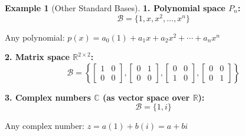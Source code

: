 \documentclass[12pt,a4paper]{article}
\theoremstyle{definition}
\newtheorem{example}{Example}[section]
\begin{document}
\begin{example}[Other Standard Bases]
\textbf{1. Polynomial space $P_n$:}
\begin{equation}
\mathcal{B} = \{1, x, x^2, \ldots, x^n\}
\end{equation}

Any polynomial: $p(x) = a_0(1) + a_1x + a_2x^2 + \cdots + a_nx^n$

\textbf{2. Matrix space $\mathbb{R}^{2 \times 2}$:}
\begin{equation}
\mathcal{B} = \left\{\begin{bmatrix} 1 & 0 \\ 0 & 0 \end{bmatrix}, \begin{bmatrix} 0 & 1 \\ 0 & 0 \end{bmatrix}, \begin{bmatrix} 0 & 0 \\ 1 & 0 \end{bmatrix}, \begin{bmatrix} 0 & 0 \\ 0 & 1 \end{bmatrix}\right\}
\end{equation}

\textbf{3. Complex numbers $\mathbb{C}$ (as vector space over $\mathbb{R}$):}
\begin{equation}
\mathcal{B} = \{1, i\}
\end{equation}

Any complex number: $z = a(1) + b(i) = a + bi$
\end{example}
\end{document}
